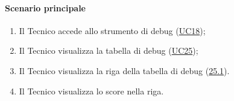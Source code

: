 \paragraph*{Scenario principale}
\begin{enumerate}
  \item Il Tecnico accede allo strumento di debug (\hyperref[UC18]{UC18});
  \item Il Tecnico visualizza la tabella di debug (\hyperref[UC25]{UC25});
  \item Il Tecnico visualizza la riga della tabella di debug (\hyperref[UC25poin1]{25.1}).
  \item Il Tecnico visualizza lo score nella riga.
\end{enumerate}

